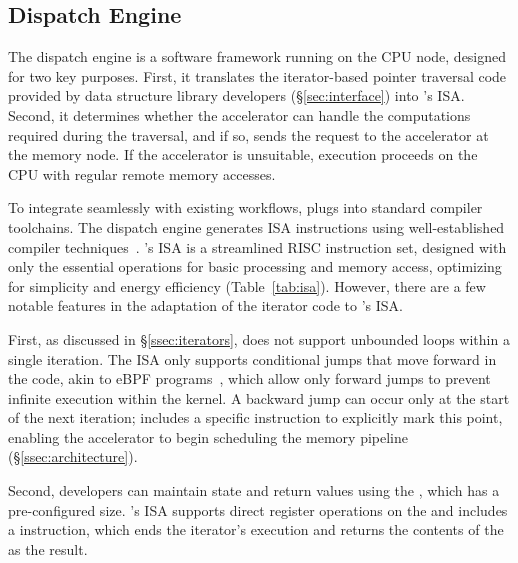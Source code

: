 \subsection{\pulse Dispatch Engine}
\label{ssec:compute_node}
The dispatch engine is a software framework running on the CPU node, designed for two key purposes. First, it translates the iterator-based pointer traversal code provided by data structure library developers (\S\ref{sec:interface}) into \pulse's ISA. Second, it determines whether the accelerator can handle the computations required during the traversal, and if so, sends the request to the accelerator at the memory node. If the accelerator is unsuitable, execution proceeds on the CPU with regular remote memory accesses.

 To integrate seamlessly with existing workflows, \pulse plugs into standard compiler toolchains. The dispatch engine generates \pulse ISA instructions using well-established compiler techniques~\cite{llvm}. \pulse's ISA is a streamlined RISC instruction set, designed with only the essential operations for basic processing and memory access, optimizing for simplicity and energy efficiency (Table~\ref{tab:isa}). However, there are a few notable features in the adaptation of the iterator code to \pulse's ISA. 

First, as discussed in \S\ref{ssec:iterators}, \pulse does not support unbounded loops within a single iteration. The ISA only supports conditional jumps that move forward in the code, akin to eBPF programs~\cite{ebpfjump}, which allow only forward jumps to prevent infinite execution within the kernel. A backward jump can occur only at the start of the next iteration; \pulse includes a specific  instruction to explicitly mark this point, enabling the accelerator to begin scheduling the memory pipeline (\S\ref{ssec:architecture}). 

Second, developers can maintain state and return values using the , which has a pre-configured size. \pulse's ISA supports direct register operations on the  and includes a  instruction, which ends the iterator's execution and returns the contents of the  as the result.

